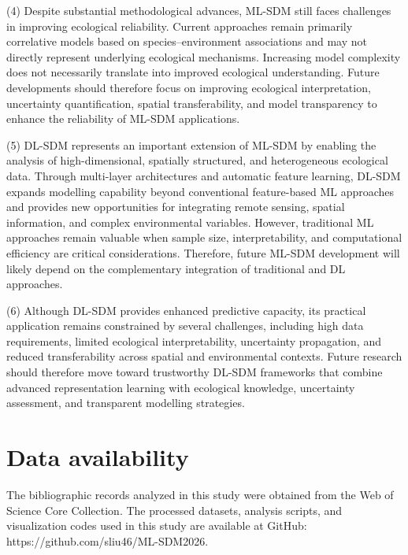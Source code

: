 \documentclass[authoryear,preprint,review,12pt]{elsarticle}
\begin{document}
(4) Despite substantial methodological advances, ML-SDM still faces challenges in improving ecological reliability. Current approaches remain primarily correlative models based on species–environment associations and may not directly represent underlying ecological mechanisms. Increasing model complexity does not necessarily translate into improved ecological understanding. Future developments should therefore focus on improving ecological interpretation, uncertainty quantification, spatial transferability, and model transparency to enhance the reliability of ML-SDM applications.

(5) DL-SDM represents an important extension of ML-SDM by enabling the analysis of high-dimensional, spatially structured, and heterogeneous ecological data. Through multi-layer architectures and automatic feature learning, DL-SDM expands modelling capability beyond conventional feature-based ML approaches and provides new opportunities for integrating remote sensing, spatial information, and complex environmental variables. However, traditional ML approaches remain valuable when sample size, interpretability, and computational efficiency are critical considerations. Therefore, future ML-SDM development will likely depend on the complementary integration of traditional and DL approaches.

(6) Although DL-SDM provides enhanced predictive capacity, its practical application remains constrained by several challenges, including high data requirements, limited ecological interpretability, uncertainty propagation, and reduced transferability across spatial and environmental contexts. Future research should therefore move toward trustworthy DL-SDM frameworks that combine advanced representation learning with ecological knowledge, uncertainty assessment, and transparent modelling strategies.


\section*{Data availability}

The bibliographic records analyzed in this study were obtained from the Web of Science Core Collection. The processed datasets, analysis scripts, and visualization codes used in this study are available at GitHub: https://github.com/sliu46/ML-SDM2026.



 

\end{document}
